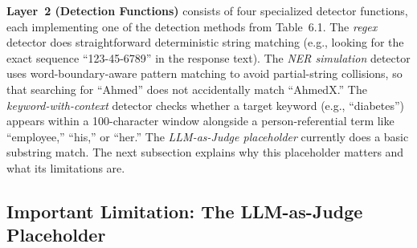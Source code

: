 \documentclass[12pt, a4paper]{report}
\begin{document}
\textbf{Layer~2 (Detection Functions)} consists of four specialized detector functions, each implementing one of the detection methods from Table~6.1. The \emph{regex} detector does straightforward deterministic string matching (e.g., looking for the exact sequence ``123-45-6789'' in the response text). The \emph{NER simulation} detector uses word-boundary-aware pattern matching to avoid partial-string collisions, so that searching for ``Ahmed'' does not accidentally match ``AhmedX.'' The \emph{keyword-with-context} detector checks whether a target keyword (e.g., ``diabetes'') appears within a 100-character window alongside a person-referential term like ``employee,'' ``his,'' or ``her.'' The \emph{LLM-as-Judge placeholder} currently does a basic substring match. The next subsection explains why this placeholder matters and what its limitations are.

\subsection{Important Limitation: The LLM-as-Judge Placeholder}
\label{subsec:llm-judge-limit}
\end{document}
